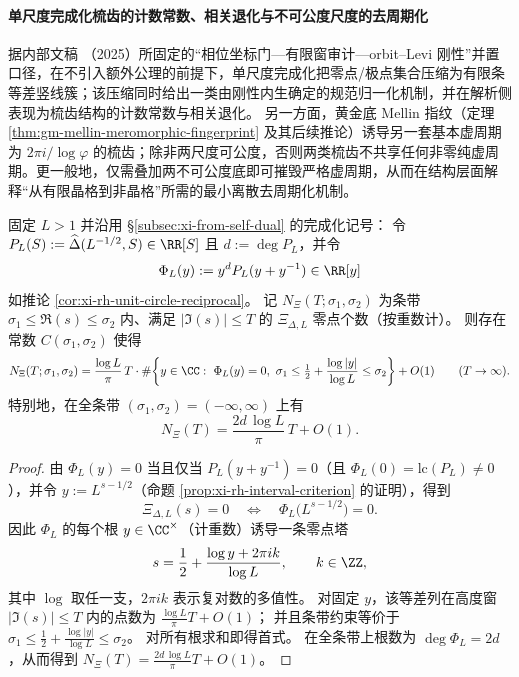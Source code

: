\paragraph{单尺度完成化梳齿的计数常数、相关退化与不可公度尺度的去周期化}
据内部文稿 \cite{Internal2025ResolutionFoldingPhiPi}（2025）所固定的“相位坐标门—有限窗审计—orbit–Levi 刚性”并置口径，在不引入额外公理的前提下，单尺度完成化把零点/极点集合压缩为有限条等差竖线簇；该压缩同时给出一类由刚性内生确定的规范归一化机制，并在解析侧表现为梳齿结构的计数常数与相关退化。
另一方面，黄金底 Mellin 指纹（定理 \ref{thm:gm-mellin-meromorphic-fingerprint} 及其后续推论）诱导另一套基本虚周期为 \(2\pi i/\log\varphi\) 的梳齿；除非两尺度可公度，否则两类梳齿不共享任何非零纯虚周期。更一般地，仅需叠加两不可公度底即可摧毁严格虚周期，从而在结构层面解释“从有限晶格到非晶格”所需的最小离散去周期化机制。

\begin{proposition}\label{prop:xi-single-scale-completed-zero-count-leading-constant}
固定 \(L>1\) 并沿用 \S\ref{subsec:xi-from-self-dual} 的完成化记号：
令
\(
P_L(S):=\widehat\Delta(L^{-1/2},S)\in\RR[S]
\)
且 \(d:=\deg P_L\)，并令
\[
\Phi_L(y):=y^{d}P_L(y+y^{-1})\in\RR[y]
\]
如推论 \ref{cor:xi-rh-unit-circle-reciprocal}。
记 \(N_{\Xi}(T;\sigma_1,\sigma_2)\) 为条带 \(\sigma_1\le \Re(s)\le \sigma_2\) 内、满足 \(|\Im(s)|\le T\) 的 \(\Xi_{\Delta,L}\) 零点个数（按重数计）。
则存在常数 \(C(\sigma_1,\sigma_2)\) 使得
\[
N_{\Xi}(T;\sigma_1,\sigma_2)
=\frac{\log L}{\pi}\,T\cdot
\#\!\left\{
y\in\CC:\ \Phi_L(y)=0,\ 
\sigma_1\le \tfrac12+\frac{\log|y|}{\log L}\le \sigma_2
\right\}
+O(1)\qquad(T\to\infty).
\]
特别地，在全条带 \((\sigma_1,\sigma_2)=(-\infty,\infty)\) 上有
\[
N_{\Xi}(T)
=\frac{2d\,\log L}{\pi}\,T+O(1).
\]
\end{proposition}

\begin{proof}
由 \(\Phi_L(y)=0\) 当且仅当 \(P_L(y+y^{-1})=0\)（且 \(\Phi_L(0)=\mathrm{lc}(P_L)\neq 0\)），并令 \(y:=L^{s-1/2}\)（命题 \ref{prop:xi-rh-interval-criterion} 的证明），得到
\[
\Xi_{\Delta,L}(s)=0\quad\Longleftrightarrow\quad \Phi_L\!\bigl(L^{s-1/2}\bigr)=0.
\]
因此 \(\Phi_L\) 的每个根 \(y\in\CC^\times\)（计重数）诱导一条零点塔
\[
s=\frac12+\frac{\log y+2\pi i k}{\log L},\qquad k\in\ZZ,
\]
其中 \(\log\) 取任一支，\(2\pi i k\) 表示复对数的多值性。
对固定 \(y\)，该等差列在高度窗 \(|\Im(s)|\le T\) 内的点数为 \(\frac{\log L}{\pi}T+O(1)\)；
并且条带约束等价于
\(
\sigma_1\le \frac12+\frac{\log|y|}{\log L}\le \sigma_2
\)。
对所有根求和即得首式。
在全条带上根数为 \(\deg\Phi_L=2d\)，从而得到
\(
N_{\Xi}(T)=\frac{2d\,\log L}{\pi}T+O(1)
\)。
\end{proof}

